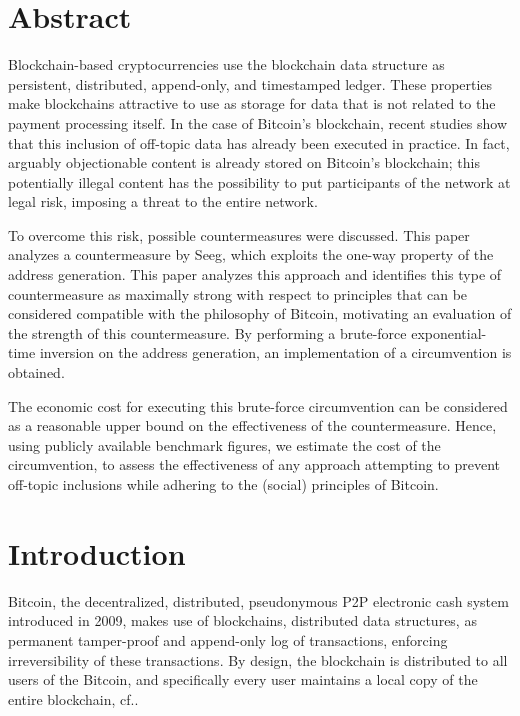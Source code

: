 \documentclass[a4paper,11pt,titlepage]{scrbook}
\newcommand{\blankpage}{
 \clearpage{\pagestyle{empty}\cleardoublepage}
}
\begin{document}
\frontmatter
{}

\setmarginsrb{3cm}{1cm}{3cm}{1cm}{6mm}{7mm}{5mm}{15mm}
\chapter*{Abstract}
Blockchain-based cryptocurrencies use the blockchain data structure as persistent, distributed, append-only, and timestamped ledger.
These properties make blockchains attractive to use as storage for data that is not related to the payment processing itself.
In the case of Bitcoin's blockchain, recent studies show that this inclusion of off-topic data has already been executed in practice.
In fact, arguably objectionable content is already stored on Bitcoin's blockchain;
this potentially illegal content has the possibility to put participants of the network at legal risk, imposing a threat to the entire network.

To overcome this risk, possible countermeasures were discussed. This paper analyzes a countermeasure by Seeg, which exploits the one-way property of the address generation.
This paper analyzes this approach and identifies this type of countermeasure as maximally strong with respect to principles that can be considered compatible with the philosophy of Bitcoin, motivating an evaluation of the strength of this countermeasure.
By performing a brute-force exponential-time inversion on the address generation, an implementation of a circumvention is obtained.

The economic cost for executing this brute-force circumvention can be considered as a reasonable upper bound on the effectiveness of the countermeasure.
Hence, using publicly available benchmark figures, we estimate the cost of the circumvention, to assess the effectiveness of any approach attempting to prevent off-topic inclusions while adhering to the (social) principles of Bitcoin.





\tableofcontents
\blankpage

\mainmatter
{}
\chapter{Introduction}

Bitcoin, the decentralized, distributed, pseudonymous P2P electronic cash system introduced in 2009, makes use of blockchains, distributed data structures, as permanent tamper-proof and append-only log of transactions, enforcing irreversibility of these transactions.
By design, the blockchain is distributed to all users of the Bitcoin, and specifically every user maintains a local copy of the entire blockchain, cf.\@ \cite{nakamoto_bitcoin_2008}.
\end{document}
